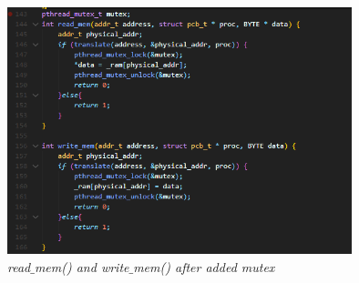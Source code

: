 \documentclass[13pt,a4paper]{article}
\begin{document}
			\begin{figure}[h!]
				\begin{center}
					\includegraphics[width=10cm]{mutex.png}
					\caption{\textit{read$\_$mem() and write$\_$mem() after added mutex}}
				\end{center}
			\end{figure}
		\newpage
\end{document}
